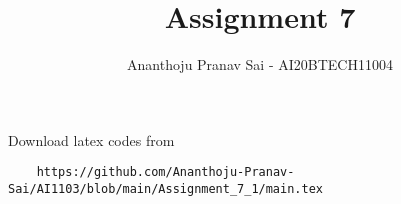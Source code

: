 \documentclass[journal,12pt,twocolumn]{IEEEtran}
\DeclareMathOperator*{\Res}{Res}
\begin{document}
\newcommand{\BEQA}{\begin{eqnarray}}
\newcommand{\EEQA}{\end{eqnarray}}
\newcommand{\define}{\stackrel{\triangle}{=}}

\raggedbottom
\setlength{\parindent}{0pt}
\providecommand{\mbf}{\mathbf}
\providecommand{\pr}[1]{\ensuremath{\Pr\left(#1\right)}}
\providecommand{\qfunc}[1]{\ensuremath{Q\left(#1\right)}}
\providecommand{\sbrak}[1]{\ensuremath{{}\left[#1\right]}}
\providecommand{\lsbrak}[1]{\ensuremath{{}\left[#1\right.}}
\providecommand{\rsbrak}[1]{\ensuremath{{}\left.#1\right]}}
\providecommand{\brak}[1]{\ensuremath{\left(#1\right)}}
\providecommand{\lbrak}[1]{\ensuremath{\left(#1\right.}}
\providecommand{\rbrak}[1]{\ensuremath{\left.#1\right)}}
\providecommand{\cbrak}[1]{\ensuremath{\left\{#1\right\}}}
\providecommand{\lcbrak}[1]{\ensuremath{\left\{#1\right.}}
\providecommand{\rcbrak}[1]{\ensuremath{\left.#1\right\}}}
\theoremstyle{remark}
\newtheorem{rem}{Remark}
\newcommand{\sgn}{\mathop{\mathrm{sgn}}}
\providecommand{\abs}[1]{\vert#1\vert}
\providecommand{\res}[1]{\Res\displaylimits_{#1}} 
\providecommand{\norm}[1]{\lVert#1\rVert}
\providecommand{\mtx}[1]{\mathbf{#1}}
\providecommand{\mean}[1]{E[ #1 ]}
\providecommand{\fourier}{\overset{\mathcal{F}}{ \rightleftharpoons}}
\providecommand{\system}{\overset{\mathcal{H}}{ \longleftrightarrow}}
\newcommand{\solution}{\noindent \textbf{Solution: }}
\newcommand{\cosec}{\,\text{cosec}\,}
\providecommand{\dec}[2]{\ensuremath{\overset{#1}{\underset{#2}{\gtrless}}}}
\newcommand{\myvec}[1]{\ensuremath{\begin{pmatrix}#1\end{pmatrix}}}
\newcommand{\mydet}[1]{\ensuremath{\begin{vmatrix}#1\end{vmatrix}}}
\makeatletter
{}
\makeatother
\let\StandardTheFigure\thefigure
\let\vec\mathbf
\renewcommand{\thefigure}{\theproblem}
\def\putbox#1#2#3{\makebox[0in][l]{\makebox[#1][l]{}\raisebox{\baselineskip}[0in][0in]{\raisebox{#2}[0in][0in]{#3}}}}
     \def\rightbox#1{\makebox[0in][r]{#1}}
     \def\centbox#1{\makebox[0in]{#1}}
     \def\topbox#1{\raisebox{-\baselineskip}[0in][0in]{#1}}
     \def\midbox#1{\raisebox{-0.5\baselineskip}[0in][0in]{#1}}
\vspace{3cm}
\title{Assignment 7}
\author{Ananthoju Pranav Sai - AI20BTECH11004}
\maketitle
\newpage
\bigskip
\renewcommand{\thefigure}{\theenumi}
\renewcommand{\thetable}{\theenumi}
Download latex codes from 
%
\begin{lstlisting}
    https://github.com/Ananthoju-Pranav-Sai/AI1103/blob/main/Assignment_7_1/main.tex
\end{lstlisting}
\end{document}
